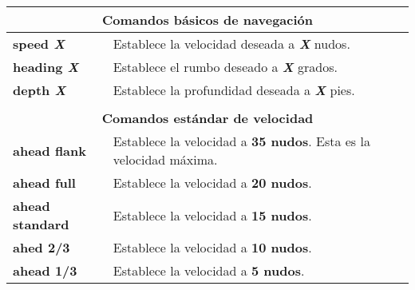 \begin{table}[h]
	\centering
	\begin{tabular}{@{}ll@{}}
		\toprule
		\multicolumn{2}{c}{\textbf{Comandos básicos de navegación}}                                                                                                       \\ \midrule
		\textbf{speed \textit{X}}         & Establece la velocidad deseada a \textbf{\textit{X}} nudos.                                                                                              \\
		\textbf{heading \textit{X}}       & Establece el rumbo deseado a \textbf{\textit{X}} grados.                                                                                                 \\
		\textbf{depth \textit{X}}         & Establece la profundidad deseada a \textbf{\textit{X}} pies.                                                                                             \\
		&                                                                                                                                        \\ \midrule
		\multicolumn{2}{c}{\textbf{Comandos estándar de velocidad}}                                                                                                       \\ \midrule
		\textbf{ahead flank}     & Establece la velocidad a \textbf{35 nudos}. Esta es la velocidad máxima.                                                                        \\
		\textbf{ahead full}      & Establece la velocidad a \textbf{20 nudos}.                                                                                                     \\
		\textbf{ahead standard}  & Establece la velocidad a \textbf{15 nudos}.                                                                                                     \\
		\textbf{ahed 2/3}        & Establece la velocidad a \textbf{10 nudos}.                                                                                                     \\
		\textbf{ahead 1/3}       & Establece la velocidad a \textbf{5 nudos}.                                                                                                      \\

\end{tabular}
\end{table}
